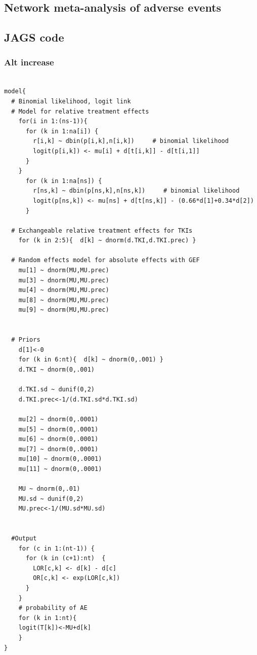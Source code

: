 \documentclass[11pt,final,fleqn]{article}\usepackage[]{graphicx}\usepackage[]{color}
\theoremstyle{plain}
\begin{document}
\begin{appendices}
\section{Network meta-analysis of adverse events}
\subsection{JAGS code}\label{sec:nma-ae-jags}



\subsubsection{Alt increase} 
\begin{verbatim} 

model{
  # Binomial likelihood, logit link
  # Model for relative treatment effects
    for(i in 1:(ns-1)){                  
      for (k in 1:na[i]) {               
        r[i,k] ~ dbin(p[i,k],n[i,k])     # binomial likelihood
        logit(p[i,k]) <- mu[i] + d[t[i,k]] - d[t[i,1]]  
      }
    }   
      for (k in 1:na[ns]) {               
        r[ns,k] ~ dbin(p[ns,k],n[ns,k])     # binomial likelihood
        logit(p[ns,k]) <- mu[ns] + d[t[ns,k]] - (0.66*d[1]+0.34*d[2])  
      }
  
  # Exchangeable relative treatment effects for TKIs
    for (k in 2:5){  d[k] ~ dnorm(d.TKI,d.TKI.prec) }
  
  # Random effects model for absolute effects with GEF
    mu[1] ~ dnorm(MU,MU.prec) 
    mu[3] ~ dnorm(MU,MU.prec) 
    mu[4] ~ dnorm(MU,MU.prec) 
    mu[8] ~ dnorm(MU,MU.prec) 
    mu[9] ~ dnorm(MU,MU.prec) 
       
       
  # Priors
    d[1]<-0                                     
    for (k in 6:nt){  d[k] ~ dnorm(0,.001) }     
    d.TKI ~ dnorm(0,.001)
    
    d.TKI.sd ~ dunif(0,2) 
    d.TKI.prec<-1/(d.TKI.sd*d.TKI.sd)
    
    mu[2] ~ dnorm(0,.0001)                     
    mu[5] ~ dnorm(0,.0001)                       
    mu[6] ~ dnorm(0,.0001)                       
    mu[7] ~ dnorm(0,.0001)                       
    mu[10] ~ dnorm(0,.0001)                       
    mu[11] ~ dnorm(0,.0001)                       
      
    MU ~ dnorm(0,.01)                         
    MU.sd ~ dunif(0,2) 
    MU.prec<-1/(MU.sd*MU.sd)
    
      
  #Output                                        
    for (c in 1:(nt-1)) {                        
      for (k in (c+1):nt)  { 
        LOR[c,k] <- d[k] - d[c]
        OR[c,k] <- exp(LOR[c,k])
      }  
    }
    # probability of AE
    for (k in 1:nt){ 
    logit(T[k])<-MU+d[k]
    }
}


\end{verbatim}
\end{appendices}
\end{document}
